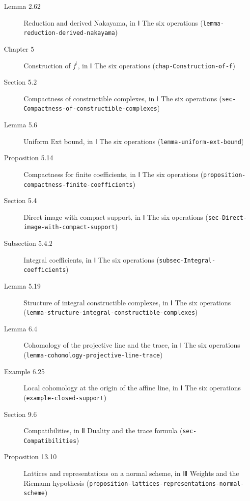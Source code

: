 \documentclass[11pt]{article}
\newcommand{\bpslug}[1]{\texttt{#1}}
\begin{document}
\begin{description}
\item[Lemma 2.62] Reduction and derived Nakayama, in Ⅰ The six operations (\bpslug{lemma-{}\allowbreak{}reduction-{}\allowbreak{}derived-{}\allowbreak{}nakayama})
\item[Chapter 5] Construction of $f^!$, in Ⅰ The six operations (\bpslug{chap-{}\allowbreak{}Construction-{}\allowbreak{}of-{}\allowbreak{}f})
\item[Section 5.2] Compactness of constructible complexes, in Ⅰ The six operations (\bpslug{sec-{}\allowbreak{}Compactness-{}\allowbreak{}of-{}\allowbreak{}constructible-{}\allowbreak{}complexes})
\item[Lemma 5.6] Uniform Ext bound, in Ⅰ The six operations (\bpslug{lemma-{}\allowbreak{}uniform-{}\allowbreak{}ext-{}\allowbreak{}bound})
\item[Proposition 5.14] Compactness for finite coefficients, in Ⅰ The six operations (\bpslug{proposition-{}\allowbreak{}compactness-{}\allowbreak{}finite-{}\allowbreak{}coefficients})
\item[Section 5.4] Direct image with compact support, in Ⅰ The six operations (\bpslug{sec-{}\allowbreak{}Direct-{}\allowbreak{}image-{}\allowbreak{}with-{}\allowbreak{}compact-{}\allowbreak{}support})
\item[Subsection 5.4.2] Integral coefficients, in Ⅰ The six operations (\bpslug{subsec-{}\allowbreak{}Integral-{}\allowbreak{}coefficients})
\item[Lemma 5.19] Structure of integral constructible complexes, in Ⅰ The six operations (\bpslug{lemma-{}\allowbreak{}structure-{}\allowbreak{}integral-{}\allowbreak{}constructible-{}\allowbreak{}complexes})
\item[Lemma 6.4] Cohomology of the projective line and the trace, in Ⅰ The six operations (\bpslug{lemma-{}\allowbreak{}cohomology-{}\allowbreak{}projective-{}\allowbreak{}line-{}\allowbreak{}trace})
\item[Example 6.25] Local cohomology at the origin of the affine line, in Ⅰ The six operations (\bpslug{example-{}\allowbreak{}closed-{}\allowbreak{}support})
\item[Section 9.6] Compatibilities, in Ⅱ Duality and the trace formula (\bpslug{sec-{}\allowbreak{}Compatibilities})
\item[Proposition 13.10] Lattices and representations on a normal scheme, in Ⅲ Weights and the Riemann hypothesis (\bpslug{proposition-{}\allowbreak{}lattices-{}\allowbreak{}representations-{}\allowbreak{}normal-{}\allowbreak{}scheme})
\end{description}
\clearpage{}%
\end{document}
